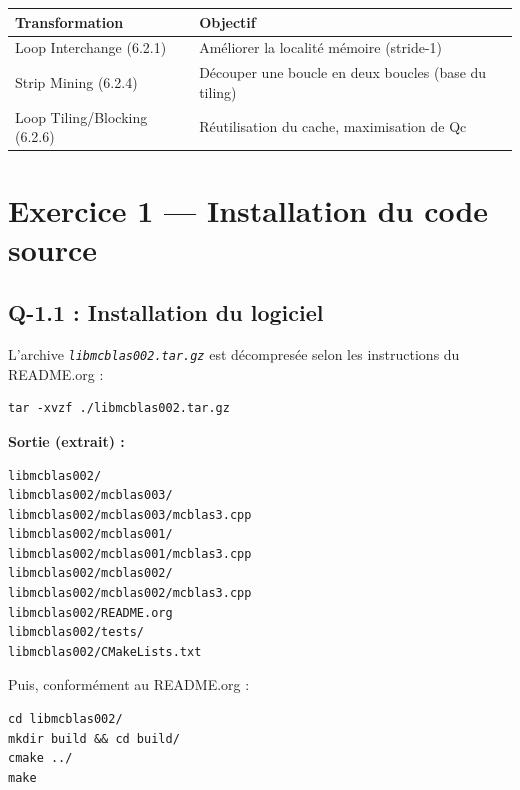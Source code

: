 \documentclass[a4paper,11pt]{article}
\newcommand{\file}[1]{\texttt{\textit{#1}}}
\begin{document}
\begin{center}
\begin{tabular}{L{4cm}L{9cm}}
  \toprule
  \textbf{Transformation} & \textbf{Objectif} \\
  \midrule
  Loop Interchange (6.2.1)     & Am\'eliorer la localit\'e m\'emoire (stride-1) \\
  Strip Mining (6.2.4)         & D\'ecouper une boucle en deux boucles (base du tiling) \\
  Loop Tiling/Blocking (6.2.6) & R\'eutilisation du cache, maximisation de Qc \\
  \bottomrule
\end{tabular}
\end{center}

\newpage

\section{Exercice 1 --- Installation du code source}

\subsection{Q-1.1 : Installation du logiciel}

L'archive \file{libmcblas002.tar.gz} est d\'ecompres\'ee selon les instructions du
README.org :

\begin{lstlisting}[style=bash, caption={D\'ecompression de l'archive}]
tar -xvzf ./libmcblas002.tar.gz
\end{lstlisting}

\textbf{Sortie (extrait) :}
\begin{lstlisting}[style=output]
libmcblas002/
libmcblas002/mcblas003/
libmcblas002/mcblas003/mcblas3.cpp
libmcblas002/mcblas001/
libmcblas002/mcblas001/mcblas3.cpp
libmcblas002/mcblas002/
libmcblas002/mcblas002/mcblas3.cpp
libmcblas002/README.org
libmcblas002/tests/
libmcblas002/CMakeLists.txt
\end{lstlisting}

Puis, conform\'ement au README.org :

\begin{lstlisting}[style=bash, caption={Compilation avec cmake et make}]
cd libmcblas002/
mkdir build && cd build/
cmake ../
make
\end{lstlisting}
\end{document}

